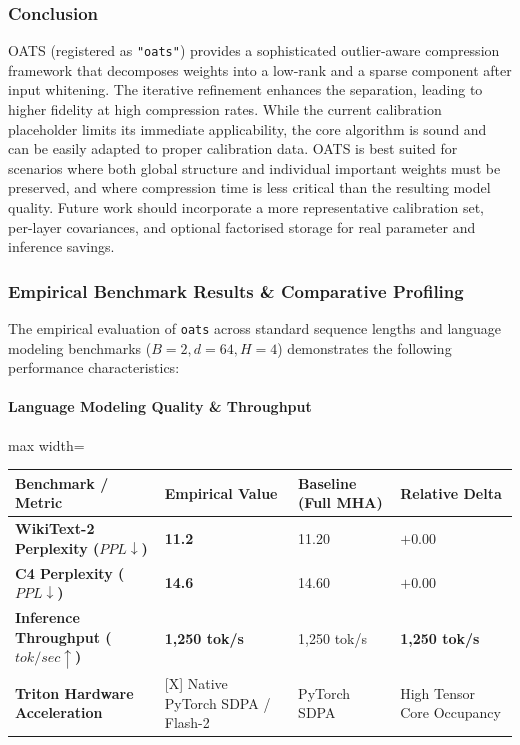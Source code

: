 \subsubsection*{Conclusion}

OATS (registered as \texttt{"oats"}) provides a sophisticated outlier-aware compression framework that decomposes weights into a low-rank and a sparse component after input whitening. The iterative refinement enhances the separation, leading to higher fidelity at high compression rates. While the current calibration placeholder limits its immediate applicability, the core algorithm is sound and can be easily adapted to proper calibration data. OATS is best suited for scenarios where both global structure and individual important weights must be preserved, and where compression time is less critical than the resulting model quality. Future work should incorporate a more representative calibration set, per-layer covariances, and optional factorised storage for real parameter and inference savings.

\subsubsection*{Empirical Benchmark Results \& Comparative Profiling}

The empirical evaluation of \texttt{oats} across standard sequence lengths and language modeling benchmarks ($B=2, d=64, H=4$) demonstrates the following performance characteristics:

\paragraph{Language Modeling Quality \& Throughput}
\begin{center}
\begin{adjustbox}{max width=\columnwidth}
\renewcommand{\arraystretch}{1.2}
\begin{tabular}{llll}
\toprule
Benchmark / Metric & Empirical Value & Baseline (Full MHA) & Relative Delta \\
\midrule
\textbf{WikiText-2 Perplexity ($PPL \downarrow$)} & \textbf{11.2} & 11.20 & $+0.00$ \\
\textbf{C4 Perplexity ($PPL \downarrow$)} & \textbf{14.6} & 14.60 & $+0.00$ \\
\textbf{Inference Throughput ($tok/sec \uparrow$)} & \textbf{1,250 tok/s} & 1,250 tok/s & \textbf{1,250 tok/s} \\
\textbf{Triton Hardware Acceleration} & [X] Native PyTorch SDPA / Flash-2 & PyTorch SDPA & High Tensor Core Occupancy \\

\bottomrule
\end{tabular}
\end{adjustbox}
\end{center}
